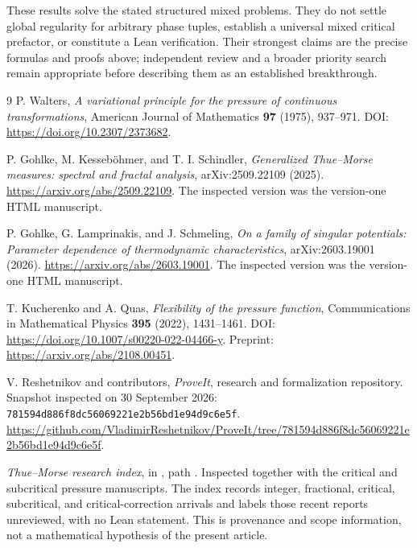 \documentclass[11pt,a4paper]{article}
\numberwithin{equation}{section}
\theoremstyle{definition}
\theoremstyle{remark}
\begin{document}
These results solve the stated structured mixed problems. They do not
settle global regularity for arbitrary phase tuples, establish a
universal mixed critical prefactor, or constitute a Lean verification.
Their strongest claims are the precise formulas and proofs above;
independent review and a broader priority search remain appropriate
before describing them as an established breakthrough.

\clearpage
\begin{thebibliography}{9}
P. Walters, \emph{A variational principle for the pressure of continuous
transformations}, American Journal of Mathematics \textbf{97} (1975),
937--971. DOI: \url{https://doi.org/10.2307/2373682}.

P. Gohlke, M. Kesseb\"ohmer, and T. I. Schindler,
\emph{Generalized Thue--Morse measures: spectral and fractal analysis},
arXiv:2509.22109 (2025).
\url{https://arxiv.org/abs/2509.22109}.
The inspected version was the version-one HTML manuscript.

P. Gohlke, G. Lamprinakis, and J. Schmeling,
\emph{On a family of singular potentials: Parameter dependence of
thermodynamic characteristics}, arXiv:2603.19001 (2026).
\url{https://arxiv.org/abs/2603.19001}.
The inspected version was the version-one HTML manuscript.

T. Kucherenko and A. Quas, \emph{Flexibility of the pressure function},
Communications in Mathematical Physics \textbf{395} (2022), 1431--1461.
DOI: \url{https://doi.org/10.1007/s00220-022-04466-y}.
Preprint: \url{https://arxiv.org/abs/2108.00451}.

V. Reshetnikov and contributors, \emph{ProveIt}, research and
formalization repository. Snapshot inspected on 30 September 2026:
\nolinkurl{781594d886f8dc56069221e2b56bd1e94d9c6e5f}.
\url{https://github.com/VladimirReshetnikov/ProveIt/tree/781594d886f8dc56069221e2b56bd1e94d9c6e5f}.

\emph{Thue--Morse research index}, in \cite{Repo}, path
.
Inspected together with the critical and subcritical pressure
manuscripts. The index records integer, fractional, critical,
subcritical, and critical-correction arrivals and labels those recent
reports unreviewed, with no Lean statement. This is provenance and
scope information, not a mathematical hypothesis of the present article.
\end{thebibliography}
\end{document}
